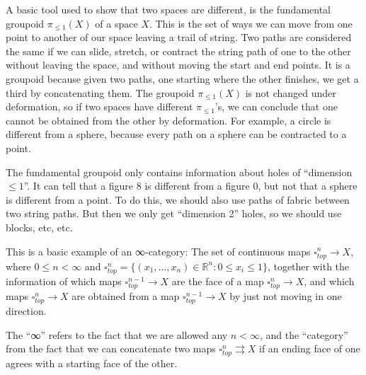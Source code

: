\documentclass[a4paper]{amsart}
\numberwithin{figure}{section}
\theoremstyle{theorem}
\theoremstyle{definition}
\newcommand{\RR}{\mathbb{R}}
\begin{document}
A basic tool used to show that two spaces are different, is the fundamental groupoid $\pi_{\leq 1}(X)$ of a space $X$. This is the set of ways we can move from one point to another of our space leaving a trail of string. Two paths are considered the same if we can slide, stretch, or contract the string path of one to the other without leaving the space, and without moving the start and end points. It is a groupoid because given two paths, one starting where the other finishes, we get a third by concatenating them. The groupoid $\pi_{\leq 1}(X)$ is not changed under deformation, so if two spaces have different $\pi_{\leq 1}$'s, we can conclude that one cannot be obtained from the other by deformation. For example, a circle is different from a sphere, because every path on a sphere can be contracted to a point.


The fundamental groupoid only contains information about holes of ``dimension  $\leq 1$''. It can tell that a figure 8 is different from a figure 0, but not that a sphere is different from a point. To do this, we should also use paths of fabric between two string paths. But then we only get ``dimension 2'' holes, so we should use blocks, etc, etc. 

This is a basic example of an ∞-category: The set of continuous maps $\square^n_{top} \to X$, where $0 \leq n < \infty$ and $\square^n_{top} = \{ (x_1, \dots, x_n) \in \RR^n : 0 \leq x_i \leq 1 \}$, together with the information of which maps $\square^{n-1}_{top} {\to} X$ are the face of a map $\square^n_{top} {\to} X$, and which maps $\square^n_{top} {\to} X$ are obtained from a map $\square^{n-1}_{top} {\to} X$ by just not moving in one direction.

The ``∞'' refers to the fact that we are allowed any $n < \infty$, and the ``category'' from the fact that we can concatenate two maps $\square^n_{top} {\rightrightarrows} X$ if an ending face of one agrees with a starting face of the other.

\end{document}
